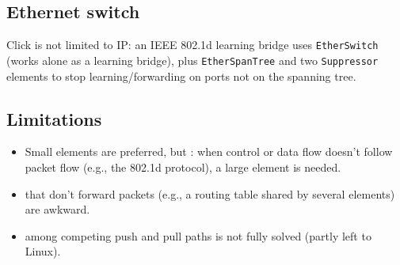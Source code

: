 \subsection{Ethernet switch}
Click is not limited to IP: an IEEE 802.1d learning bridge uses \texttt{EtherSwitch} (works alone as a learning bridge), plus \texttt{EtherSpanTree} and two \texttt{Suppressor} elements to stop learning/forwarding on ports not on the spanning tree.

\subsection{Limitations}
\begin{itemize}
\item Small elements are preferred, but : when control or data flow doesn't follow packet flow (e.g., the 802.1d protocol), a large element is needed.
\item {} that don't forward packets (e.g., a routing table shared by several elements) are awkward.
\item {} among competing push and pull paths is not fully solved (partly left to Linux).
\end{itemize}

